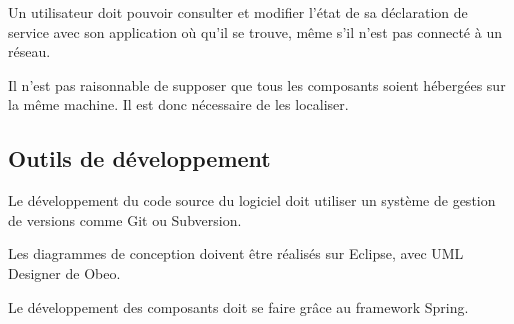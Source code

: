 \begin{requirement}
	Un utilisateur doit pouvoir consulter et modifier l’état de sa déclaration de service avec son application où qu’il se trouve, même s'il n'est pas connecté à un réseau.
\end{requirement}

\begin{requirement}
	Il n’est pas raisonnable de supposer que tous les composants soient hébergées sur la même machine.
	Il est donc nécessaire de les localiser.
\end{requirement}

\subsection{Outils de développement}

\begin{requirement}
	Le développement du code source du logiciel doit utiliser un système de gestion de versions comme Git ou Subversion.
\end{requirement}

\begin{requirement}
	Les diagrammes de conception doivent être réalisés sur Eclipse, avec UML Designer de Obeo.
\end{requirement}

\begin{requirement}[Spring]
	Le développement des composants doit se faire grâce au framework Spring.
\end{requirement}

\renewcommand{\listtheoremname}{Liste des exigences}

\listoftheorems[ignoreall,show={requirement}]

